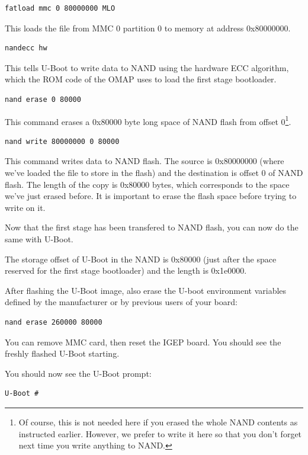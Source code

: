 \begin{verbatim}
fatload mmc 0 80000000 MLO
\end{verbatim}
This loads the file from MMC 0 partition 0 to memory at address
0x80000000.

\begin{verbatim}
nandecc hw
\end{verbatim}

This tells U-Boot to write data to NAND using the hardware ECC
algorithm, which the ROM code of the OMAP uses to load the first stage
bootloader.

\begin{verbatim}
nand erase 0 80000
\end{verbatim}

This command erases a 0x80000 byte long space of NAND flash from
offset 0\footnote{Of course, this is not needed here if you erased the
  whole NAND contents as instructed earlier. However, we prefer to
  write it here so that you don't forget next time you write anything
  to NAND.}.

\begin{verbatim}
nand write 80000000 0 80000
\end{verbatim}

This command writes data to NAND flash. The source is 0x80000000
(where we've loaded the file to store in the flash) and the
destination is offset 0 of NAND flash. The length of the copy is
0x80000 bytes, which corresponds to the space we've just erased
before. It is important to erase the flash space before trying to
write on it.

Now that the first stage has been transfered to NAND flash, you can
now do the same with U-Boot.

The storage offset of U-Boot in the NAND is 0x80000 (just after the
space reserved for the first stage bootloader) and the length is
0x1e0000.

After flashing the U-Boot image, also erase the U-boot environment
variables defined by the manufacturer or by previous users of your
board:

\begin{verbatim}
nand erase 260000 80000
\end{verbatim}

You can remove MMC card, then reset the IGEP board. You should see the
freshly flashed U-Boot starting.

You should now see the U-Boot prompt:

\begin{verbatim}
U-Boot #
\end{verbatim}

